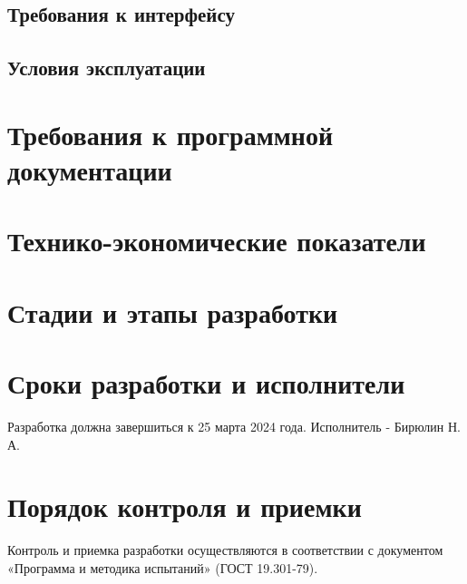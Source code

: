 \documentclass{TechDoc}
\begin{document}
    \subsection{Требования к интерфейсу}
        
    
    
    \subsection{Условия эксплуатации}
    
    

    \section{Требования к программной документации}

    

    \section{Технико-экономические показатели}
    
    

    \section{Стадии и этапы разработки}
    
    

    \section{Сроки разработки и исполнители}
    
    Разработка должна завершиться к 25 марта 2024 года. Исполнитель - Бирюлин Н. А.

    \section{Порядок контроля и приемки}

    Контроль и приемка разработки осуществляются в соответствии с документом «Программа и методика испытаний» (ГОСТ 19.301-79)\cite{gostPMI}.
    
\end{document}

